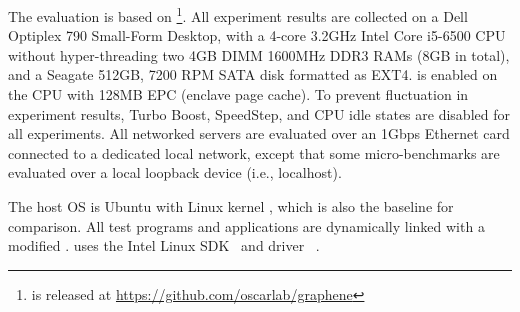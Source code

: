 The evaluation is based on \graphene{} \grapheneversion{}\footnote{\graphene{} is released at \url{https://github.com/oscarlab/graphene}}.
All experiment results are collected on a Dell Optiplex 790 Small-Form Desktop,
with a 4-core 3.2GHz Intel Core i5-6500 CPU
without hyper-threading
two 4GB DIMM 1600MHz DDR3 RAMs (8GB in total), and a Seagate 512GB, 7200 RPM SATA disk formatted as EXT4.
\sgx{} is enabled on the CPU
with 128MB EPC
(enclave page cache).
To prevent fluctuation in experiment results,
Turbo Boost, SpeedStep, and CPU idle states are disabled for
all experiments.
All networked servers are evaluated over an 1Gbps Ethernet card connected to a dedicated local network,
except that some micro-benchmarks are evaluated over a local loopback device (i.e., localhost).




The host OS is Ubuntu \ubuntuversion{} with Linux kernel \linuxversion{},
which is also the baseline for comparison.
All test programs and applications are dynamically linked
with a modified \glibc{} \glibcversion{}.
\graphenesgx{}
uses the Intel \sgx{} Linux SDK~\cite{intel-sgx-linux-sdk} and driver~\cite{intel-sgx-linux-driver} \sgxdriverversion{}.











